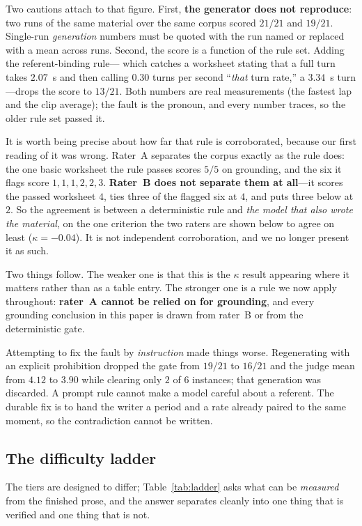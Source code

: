 \documentclass[conference]{IEEEtran}
\begin{document}
Two cautions attach to that figure. First, \textbf{the generator does not
reproduce}: two runs of the same material over the same corpus scored $21/21$
and $19/21$. Single-run \emph{generation} numbers
must be quoted with the run named or replaced with a mean across runs. Second,
the score is a function of the rule set. Adding the referent-binding rule---
which catches a worksheet stating that a full turn takes $2.07$~s and then
calling $0.30$ turns per second ``\emph{that} turn rate,'' a $3.34$~s
turn---drops the score to $13/21$. Both numbers are real measurements (the
fastest lap and the clip average); the fault is the pronoun, and every number
traces, so the older rule set passed it.

It is worth being precise about how far that rule is corroborated, because our
first reading of it was wrong. Rater~A separates the corpus exactly as the rule
does: the one basic worksheet the rule passes scores $5/5$ on grounding, and
the six it flags score $1, 1, 1, 2, 2, 3$. \textbf{Rater~B does not separate
them at all}---it scores the passed worksheet $4$, ties three of the flagged
six at $4$, and puts three below at $2$. So the agreement is between a
deterministic rule and \emph{the model that also wrote the material}, on the
one criterion the two raters are shown below to agree on least
($\kappa = -0.04$). It is not independent corroboration, and we no longer
present it as such.

Two things follow. The weaker one is that this is the $\kappa$ result appearing
where it matters rather than as a table entry. The stronger one is a rule we
now apply throughout: \textbf{rater~A cannot be relied on for grounding}, and
every grounding conclusion in this paper is drawn from rater~B or from the
deterministic gate.

Attempting to fix the fault by \emph{instruction} made things worse.
Regenerating with an explicit prohibition dropped the gate from $19/21$ to
$16/21$ and the judge mean from $4.12$ to $3.90$ while clearing only $2$ of $6$
instances; that generation was discarded. A prompt rule cannot make a model
careful about a referent. The durable fix is to hand the writer a period and a
rate already paired to the same moment, so the contradiction cannot be written.

\subsection{The difficulty ladder}

The tiers are designed to differ; Table~\ref{tab:ladder} asks what can be
\emph{measured} from the finished prose, and the answer separates cleanly into
one thing that is verified and one thing that is not.
\end{document}
